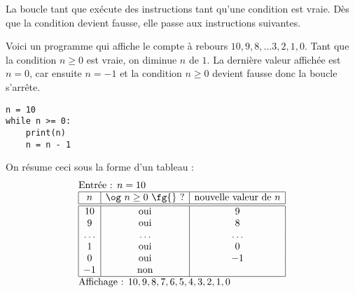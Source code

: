 \documentclass[11pt,class=report,crop=false]{standalone}
\begin{document}
\begin{cours}
La boucle \og{}tant que\fg{} exécute des instructions tant qu'une condition est vraie.
Dès que la condition devient fausse, elle passe aux instructions suivantes.




\begin{exemple}
\begin{minipage}{0.55\textwidth}
Voici un programme qui affiche le compte à rebours $10,9,8,\ldots3,2,1,0$.
Tant que la condition $n \ge 0$ est vraie, on diminue $n$ de $1$. La dernière valeur affichée est $n=0$, car ensuite $n=-1$ et la condition \og{}$n \ge 0$\fg{} devient fausse donc la boucle s'arrête.
\end{minipage}\qquad\qquad
\begin{minipage}{0.4\textwidth}
\begin{lstlisting}
n = 10
while n >= 0:
    print(n)
    n = n - 1
\end{lstlisting}
\end{minipage}

On résume ceci sous la forme d'un tableau :
  $$
  \begin{array}{l}
  \text{Entrée : $n=10$}    \\
  \begin{array}{|c|c|c|}
  \hline  
  n & \text{\og $n\ge0$ \fg{} ?} & \text{nouvelle valeur de } n \\
  \hline\hline 
  10 & \text{oui} & 9 \\
  9 & \text{oui} & 8 \\
  \ldots & \ldots & \ldots \\
  1 & \text{oui} & 0 \\
  0 & \text{oui} & -1 \\
  -1 & \text{non} &  \\ 
  \hline
  \end{array} \\
  \text{Affichage : $10,9,8,7,6,5,4,3,2,1,0$}  
  \end{array} 
  $$ 


\end{exemple}
\end{cours}
\end{document}
